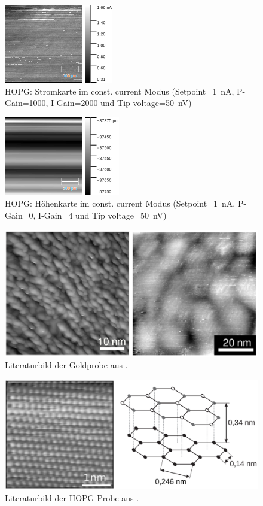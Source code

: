 \documentclass[sn-mathphys-num,iicol]{sn-jnl}
\theoremstyle{thmstyleone}
\theoremstyle{thmstyletwo}
\theoremstyle{thmstylethree}
\begin{document}
\begin{figure}[h]
        \centering
        \includegraphics[width=.5\textwidth]{../data/Graphit7_current.png}
        \caption{HOPG: Stromkarte im const. current Modus (Setpoint=\SI{1}{\nano A}, P-Gain=\SI{1000}{}, I-Gain=\SI{2000}{} und Tip voltage=\SI{50}{\nano V})} \label{fig:gr2nm50nVc3}
\end{figure}
\begin{figure}[h]
        \centering
        \includegraphics[width=.5\textwidth]{../data/Graphit7_z.png}
        \caption{HOPG: Höhenkarte im const. current Modus (Setpoint=\SI{1}{\nano A}, P-Gain=\SI{0}{}, I-Gain=\SI{4}{} und Tip voltage=\SI{50}{\nano V})} \label{fig:gr2nm50nVz3}
\end{figure}
\begin{figure}[h]
  \centering
  \includegraphics[width=.5\textwidth]{422_gold_lit.png}
  \caption{Literaturbild der Goldprobe aus \cite{anleitung422}.} \label{fig:gold_lit}
\end{figure}
\begin{figure}[h]
  \centering
  \includegraphics[width=.5\textwidth]{422_HOPG_lit.png}
  \caption{Literaturbild der HOPG Probe aus \cite{anleitung422}.} \label{fig:hopg_lit}
\end{figure}
\end{document}
